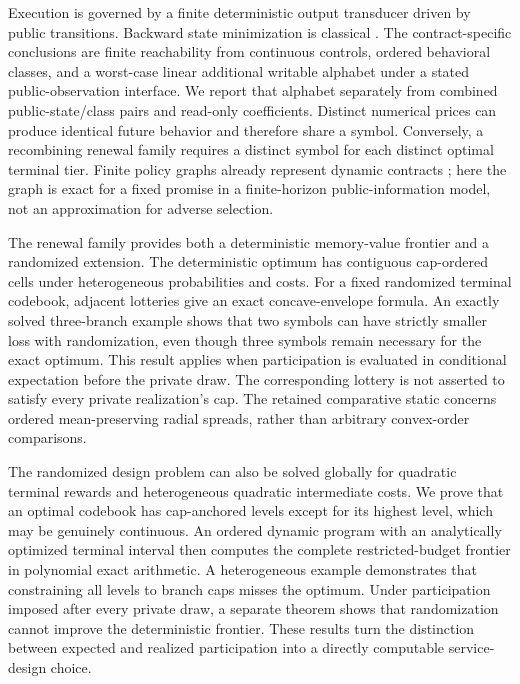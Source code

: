 Execution is governed by a finite deterministic output transducer driven by public transitions. Backward state minimization is classical \citep{BeanBirgeSmith1987,GivanDeanGreig2003,Peyriere2023}. The contract-specific conclusions are finite reachability from continuous controls, ordered behavioral classes, and a worst-case linear additional writable alphabet under a stated public-observation interface. We report that alphabet separately from combined public-state/class pairs and read-only coefficients. Distinct numerical prices can produce identical future behavior and therefore share a symbol. Conversely, a recombining renewal family requires a distinct symbol for each distinct optimal terminal tier. Finite policy graphs already represent dynamic contracts \citep{Zhang2012}; here the graph is exact for a fixed promise in a finite-horizon public-information model, not an approximation for adverse selection.

The renewal family provides both a deterministic memory-value frontier and a randomized extension. The deterministic optimum has contiguous cap-ordered cells under heterogeneous probabilities and costs. For a fixed randomized terminal codebook, adjacent lotteries give an exact concave-envelope formula. An exactly solved three-branch example shows that two symbols can have strictly smaller loss with randomization, even though three symbols remain necessary for the exact optimum. This result applies when participation is evaluated in conditional expectation before the private draw. The corresponding lottery is not asserted to satisfy every private realization's cap. The retained comparative static concerns ordered mean-preserving radial spreads, rather than arbitrary convex-order comparisons.

The randomized design problem can also be solved globally for quadratic terminal rewards and heterogeneous quadratic intermediate costs. We prove that an optimal codebook has cap-anchored levels except for its highest level, which may be genuinely continuous. An ordered dynamic program with an analytically optimized terminal interval then computes the complete restricted-budget frontier in polynomial exact arithmetic. A heterogeneous example demonstrates that constraining all levels to branch caps misses the optimum. Under participation imposed after every private draw, a separate theorem shows that randomization cannot improve the deterministic frontier. These results turn the distinction between expected and realized participation into a directly computable service-design choice.

